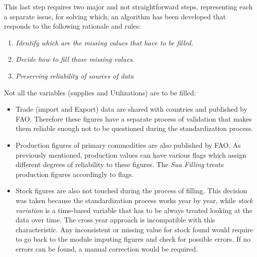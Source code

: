 \documentclass[]{article}
\providecommand{\tightlist}{%
  \setlength{\itemsep}{0pt}\setlength{\parskip}{0pt}}
\begin{document}
This last step requires two major and not straightforward steps,
representing each a separate issue, for solving which, an algorithm has
been developed that responds to the following rationale and rules:

\begin{enumerate}
\def\labelenumi{\arabic{enumi}.}
\tightlist
\item
  \emph{Identify which are the missing values that have to be filled.}
\item
  \emph{Decide how to fill those missing values.}
\item
  \emph{Preserving reliability of sources of data}
\end{enumerate}

Not all the variables (supplies and Utilizations) are to be filled:

\begin{itemize}
\tightlist
\item
  Trade (import and Export) data are shared with countries and published
  by FAO. Therefore these figures have a separate process of validation
  that makes them reliable enough not to be questioned during the
  standardization process.
\item
  Production figures of primary commodities are also published by FAO.
  As previously mentioned, production values can have various flags
  which assign different degrees of reliability to these figures. The
  \emph{Sua Filling} treats production figures accordingly to flags.
\item
  Stock figures are also not touched during the process of filling. This
  decision was taken because the standardization process works year by
  year, while \emph{stock variation} is a time-based variable that has
  to be always treated looking at the data over time. The cross year
  approach is incompatible with this characteristic. Any inconsistent or
  missing value for stock found would require to go back to the module
  imputing figures and check for possible errors. If no errors can be
  found, a manual correction would be required.
\end{itemize}
\end{document}
